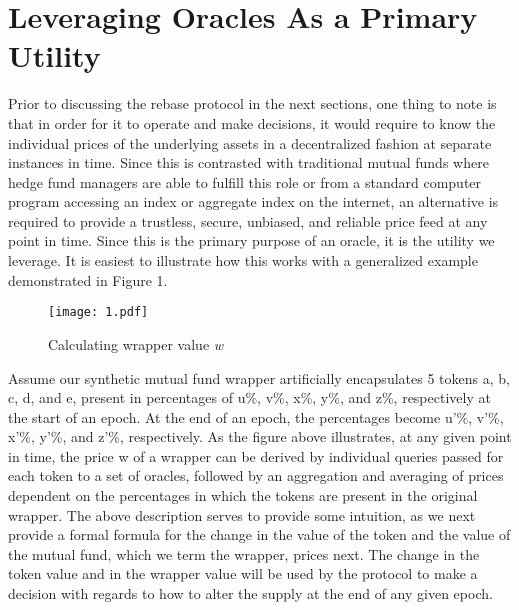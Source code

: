 \documentclass[letterpaper,11pt]{article}
\begin{document}
\section{Leveraging Oracles As a Primary Utility}
Prior to discussing the rebase protocol in the next sections, one thing to note is that in order for it to operate and make decisions, it would require to know the individual prices of the underlying assets in a decentralized fashion at separate instances in time. Since this is contrasted with traditional mutual funds where hedge fund managers are able to fulfill this role or from a standard computer program accessing an index or aggregate index on the internet, an alternative is required to provide a trustless, secure, unbiased, and reliable price feed at any point in time. Since this is the primary purpose of an oracle, it is the utility we leverage. It is easiest to illustrate how this works with a generalized example demonstrated in Figure 1.

\begin{figure}[ht] 
        \centering \texttt{[image: 1.pdf]}
        \caption{\label{art_1}Calculating wrapper value \textit{w}
        }
\end{figure}


Assume our synthetic mutual fund wrapper artificially encapsulates 5 tokens a, b, c, d, and e, present in percentages of u\%, v\%, x\%, y\%, and z\%, respectively at the start of an epoch. At the end of an epoch, the percentages become u’\%, v’\%, x’\%, y’\%, and z’\%, respectively. As the figure above illustrates, at any given point in time, the price w of a wrapper can be derived by individual queries passed for each token to a set of oracles, followed by an aggregation and averaging of prices dependent on the percentages in which the tokens are present in the original wrapper. The above description serves to provide some intuition, as we next provide a formal formula for the change in the value of the token and the value of the mutual fund, which we term the wrapper, prices next. The change in the token value and in the wrapper value will be used by the protocol to make a decision with regards to how to alter the supply at the end of any given epoch.
\end{document}
